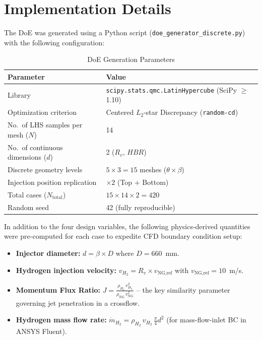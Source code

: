 \documentclass[12pt, a4paper]{report}
\begin{document}
\section{Implementation Details}

The DoE was generated using a Python script (\texttt{doe\_generator\_discrete.py}) with the following configuration:

\begin{table}[H]
\centering
\caption{DoE Generation Parameters}
\label{tab:doe_params}
\begin{tabular}{@{}ll@{}}
\toprule
\textbf{Parameter} & \textbf{Value} \\ \midrule
Library & \texttt{scipy.stats.qmc.LatinHypercube} (SciPy $\geq$ 1.10) \\
Optimization criterion & Centered $L_2$-star Discrepancy (\texttt{random-cd}) \\
No.\ of LHS samples per mesh ($N$) & 14 \\
No.\ of continuous dimensions ($d$) & 2 ($R_v$, $HBR$) \\
Discrete geometry levels & $5 \times 3 = 15$ meshes ($\theta \times \beta$) \\
Injection position replication & $\times 2$ (Top + Bottom) \\
Total cases ($N_{\text{total}}$) & $15 \times 14 \times 2 = 420$ \\
Random seed & 42 (fully reproducible) \\
\bottomrule
\end{tabular}
\end{table}

\noindent In addition to the four design variables, the following physics-derived quantities were pre-computed for each case to expedite CFD boundary condition setup:

\begin{itemize}
    \item \textbf{Injector diameter:} $d = \beta \times D$ where $D = 660$~mm.
    \item \textbf{Hydrogen injection velocity:} $v_{H_2} = R_v \times v_{\text{NG,ref}}$ with $v_{\text{NG,ref}} = 10$~m/s.
    \item \textbf{Momentum Flux Ratio:} $J = \frac{\rho_{H_2} \, v_{H_2}^2}{\rho_{\text{NG}} \, v_{\text{NG}}^2}$ -- the key similarity parameter governing jet penetration in a crossflow.
    \item \textbf{Hydrogen mass flow rate:} $\dot{m}_{H_2} = \rho_{H_2} \, v_{H_2} \, \frac{\pi}{4} d^2$ (for mass-flow-inlet BC in ANSYS Fluent).
\end{itemize}
\end{document}
